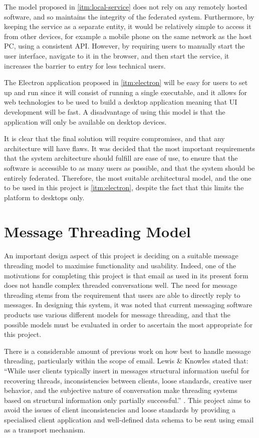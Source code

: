 The model proposed in \ref{itm:local-service} does not rely on any remotely hosted software, and so maintains the integrity of the federated system. Furthermore, by keeping the service as a separate entity, it would be relatively simple to access it from other devices, for example a mobile phone on the same network as the host PC, using a consistent API. However, by requiring users to manually start the user interface, navigate to it in the browser, and then start the service, it increases the barrier to entry for less technical users.

The Electron application proposed in \ref{itm:electron} will be easy for users to set up and run since it will consist of running a single executable, and it allows for web technologies to be used to build a desktop application meaning that UI development will be fast. A disadvantage of using this model is that the application will only be available on desktop devices.

It is clear that the final solution will require compromises, and that any architecture will have flaws. It was decided that the most important requirements that the system architecture should fulfill are ease of use, to ensure that the software is accessible to as many users as possible, and that the system should be entirely federated. Therefore, the most suitable architectural model, and the one to be used in this project is \ref{itm:electron}, despite the fact that this limits the platform to desktops only.

\section{Message Threading Model}
An important design aspect of this project is deciding on a suitable message threading model to maximise functionality and usability. Indeed, one of the motivations for completing this project is that email as used in its present form does not handle complex threaded conversations well. The need for message threading stems from the requirement that users are able to directly reply to messages. In designing this system, it was noted that current messaging software products use various different models for message threading, and that the possible models must be evaluated in order to ascertain the most appropriate for this project.

There is a considerable amount of previous work on how best to handle message threading, particularly within the scope of email. Lewis \& Knowles stated that: ``While user clients typically insert in messages structural information useful for recovering threads, inconsistencies between clients, loose standards, creative user behavior, and the subjective nature of conversation make threading systems based on structural information only partially successful.'' \cite{lewis1997threading}. This project aims to avoid the issues of client inconsistencies and loose standards by providing a specialised client application and well-defined data schema to be sent using email as a transport mechanism.

